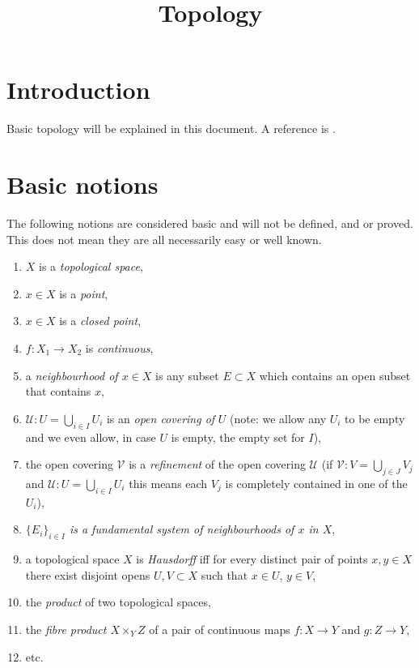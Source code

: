 

%


\title{Topology}


\maketitle

\label{section-phantom}

\tableofcontents

\section{Introduction}
\label{section-introduction}

\noindent
Basic topology will be explained in this document.
A reference is \cite{Engelking}.

\section{Basic notions}
\label{section-topology-basic}

\noindent
The following notions are considered basic and will not be defined,
and or proved. This does not mean they are all necessarily easy or
well known.

\begin{enumerate}
\item $X$ is a {\it topological space},
\label{item-space}
\item $x\in X$ is a {\it point},
\label{item-point}
\item $x\in X$ is a {\it closed point},
\label{item-closed-point}
\item $f : X_1 \to X_2$ is {\it continuous},
\label{item-continuous}
\item a {\it neighbourhood of $x \in X$} is any subset
$E \subset X$ which contains an open subset that
contains $x$,
\label{item-neighbourhood}
\item $\mathcal{U} : U = \bigcup_{i \in I} U_i$ is an
{\it open covering of} $U$ (note: we allow any $U_i$ to be empty
and we even allow, in case $U$ is empty, the empty set for $I$),
\label{item-covering}
\item the open covering $\mathcal{V}$ is a {\it refinement}
of the open covering $\mathcal{U}$ (if
$\mathcal{V} : V = \bigcup_{j \in J} V_j$ and
$\mathcal{U} : U = \bigcup_{i \in I} U_i$
this means each $V_j$ is completely contained in one of the $U_i$),
\label{item-refinement}
\item {\it $\{ E_i \}_{i \in I}$ is a fundamental system of neighbourhoods
of $x$ in $X$},
\label{item-fundamental-system}
\item a topological space $X$ is {\it Hausdorff} iff for every
distinct pair of points $x, y \in X$ there exist disjoint
opens $U, V \subset X$ such that $x \in U$, $y \in V$,
\label{item-Hausdorff}
\item the {\it product} of two topological spaces,
\item the {\it fibre product $X \times_Y Z$} of a pair of continuous maps
$f : X \to Y$ and $g : Z \to Y$,
\item etc.
\end{enumerate}

